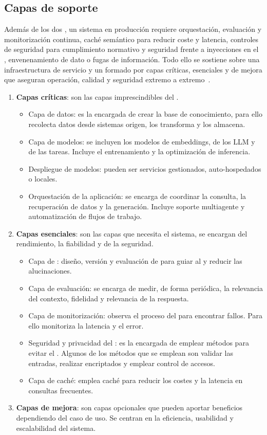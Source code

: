 \subsection{Capas de soporte}
Además de los dos , un sistema en producción requiere orquestación, evaluación y monitorización continua, caché semántico para reducir coste y latencia, controles de seguridad para cumplimiento normativo y seguridad frente a inyecciones en el , envenenamiento de dato o fugas de información. Todo ello se sostiene sobre una infraestructura de servicio y un  formado por capas críticas, esenciales y de mejora que aseguran operación, calidad y seguridad extremo a extremo~\cite{book:RAG_SimpleGuide}.
\begin{enumerate}
\tightlist
	\item \textbf{Capas críticas}: son las capas imprescindibles del .
	\begin{itemize}
	\tightlist
		\item Capa de datos: es la encargada de crear la base de conocimiento, para ello recolecta datos desde sistemas origen, los transforma y los almacena.
		\item Capa de modelos: se incluyen los modelos de embeddings, de los LLM y de las tareas. Incluye el entrenamiento y la optimización de inferencia.
		\item Despliegue de modelos: pueden ser servicios gestionados, auto-hospedados o locales.
		\item Orquestación de la aplicación: se encarga de coordinar la consulta, la recuperación de datos y la generación. Incluye soporte multiagente y automatización de flujos de trabajo. 
	\end{itemize}
	\item \textbf{Capas esenciales}: son las capas que necesita el sistema, se encargan del rendimiento, la fiabilidad y de la seguridad.
	\begin{itemize}
	\tightlist
		\item Capa de : diseño, versión y evaluación de  para guiar al  y reducir las alucinaciones. 
		\item Capa de evaluación: se encarga de medir, de forma periódica, la relevancia del contexto, fidelidad y relevancia de la respuesta.
		\item Capa de monitorización: observa el proceso del  para encontrar fallos. Para ello monitoriza la latencia y el error.
		\item Seguridad y privacidad del : es la encargada de emplear métodos para evitar el . Algunos de los métodos que se emplean son validar las entradas, realizar encriptados y emplear control de accesos.
		\item Capa de caché: emplea caché para reducir los costes y la latencia en consultas frecuentes.
	\end{itemize}
	\item \textbf{Capas de mejora}: son capas opcionales que pueden aportar beneficios dependiendo del caso de uso. Se centran en la eficiencia, usabilidad y escalabilidad del sistema.
\end{enumerate}

